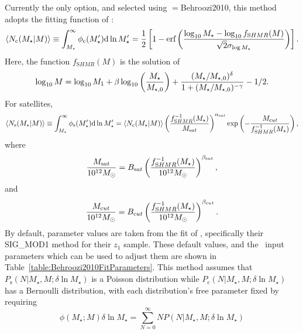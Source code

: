 Currently the only option, and selected using {\normalfont \ttfamily [conditionalStellarMassFunctionMethod]}$=${\normalfont \ttfamily Behroozi2010}, this method adopts the fitting function of \cite{behroozi_comprehensive_2010}:
\begin{equation}
 \langle N_{\mathrm c}(M_\star|M)\rangle \equiv \int_{M_\star}^\infty \phi_{\mathrm c}(M_\star^\prime) \d \ln M_\star^\prime = {1 \over 2} \left[ 1 - \hbox{erf}\left( {\log_{10}M_\star - \log_{10} f_{\mathrm SHMR}(M) \over \sqrt{2}\sigma_{\log M_\star}} \right) \right].
\end{equation}
Here, the function $f_{\mathrm SHMR}(M)$ is the solution of
\begin{equation}
 \log_{10}M = \log_{10}M_1 + \beta \log_{10}\left({M_\star \over M_{\star,0}}\right) + {(M_\star/M_{\star,0})^\delta \over 1 + (M_\star/M_{\star,0})^{-\gamma}} - {1/2}.
\end{equation}
For satellites,
\begin{equation}
 \langle N_{\mathrm s}(M_\star|M)\rangle \equiv \int_{M_\star}^\infty \phi_{\mathrm s}(M_\star^\prime) \d \ln M_\star^\prime =  \langle N_{\mathrm c}(M_\star|M)\rangle \left({f^{-1}_{\mathrm SHMR}(M_\star) \over M_{\mathrm sat}}\right)^{\alpha_{\mathrm sat}} \exp\left(- {M_{\mathrm cut} \over f^{-1}_{\mathrm SHMR}(M_\star)} \right),
\end{equation}
where
\begin{equation}
 {M_{\mathrm sat} \over 10^{12} M_\odot} = B_{\mathrm sat} \left({f^{-1}_{\mathrm SHMR}(M_\star) \over 10^{12} M_\odot}\right)^{\beta_{\mathrm sat}},
\end{equation}
and
\begin{equation}
 {M_{\mathrm cut} \over 10^{12} M_\odot} = B_{\mathrm cut} \left({f^{-1}_{\mathrm SHMR}(M_\star) \over 10^{12} M_\odot}\right)^{\beta_{\mathrm cut}}.
\end{equation}
By default, parameter values are taken from the fit of \cite{leauthaud_new_2011}, specifically their {\normalfont \ttfamily SIG\_MOD1} method for their $z_1$ sample. These default values, and the \glc\ input parameters which can be used to adjust them are shown in Table~\ref{table:Behroozi2010FitParameters}. This method assumes that $P_{\mathrm s}(N|M_\star,M;\delta \ln M_\star)$ is a Poisson distribution while $P_{\mathrm c}(N|M_\star,M;\delta \ln M_\star)$ has a Bernoulli distribution, with each distribution's free parameter fixed by requiring
\begin{equation}
 \phi(M_\star;M) \delta \ln M_\star = \sum_{N=0}^\infty N P(N|M_\star,M;\delta \ln M_\star)
\end{equation}

